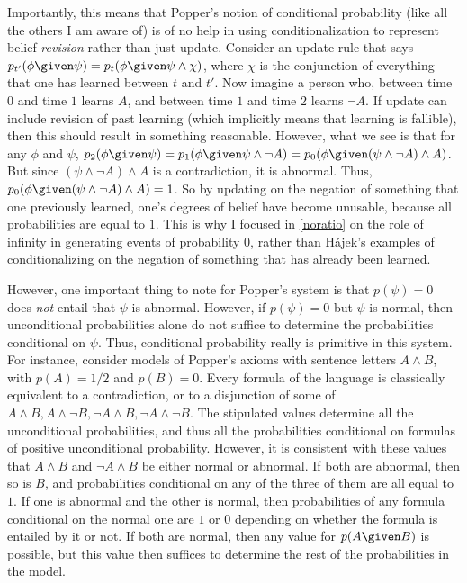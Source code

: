 Importantly, this means that Popper's notion of conditional probability (like all the others I am aware of) is of no help in using conditionalization to represent belief \emph{revision} rather than just update. Consider an update rule that says $p_{t'}(\phi \given \psi)=p_{t}(\phi \given \psi\land\chi)$, where $\chi$ is the conjunction of everything that one has learned between $t$ and $t'$. Now imagine a person who, between time $0$ and time $1$ learns $A$, and between time $1$ and time $2$ learns $\lnot A$. If update can include revision of past learning (which implicitly means that learning is fallible), then this should result in something reasonable. However, what we see is that for any $\phi$ and $\psi$, $p_2(\phi \given \psi)=p_1(\phi \given \psi\land\lnot A)=p_0(\phi \given (\psi\land\lnot A)\land A)$. But since $(\psi\land\lnot A)\land A$ is a contradiction, it is abnormal. Thus, $p_0(\phi \given (\psi\land\lnot A)\land A)=1$. So by updating on the negation of something that one previously learned, one's degrees of belief have become unusable, because all probabilities are equal to $1$. This is why I focused in \autoref{noratio} on the role of infinity in generating events of  probability $0$, rather than H\'{a}jek's examples of conditionalizing on the negation of something that has already been learned.

However, one important thing to note for Popper's system is that $p(\psi)=0$ does \emph{not} entail that $\psi$ is abnormal. However, if $p(\psi)=0$ but $\psi$ is normal, then unconditional probabilities alone do not suffice to determine the probabilities conditional on $\psi$. Thus, conditional probability really is primitive in this system. For instance, consider models of Popper's axioms with sentence letters $A\land B$, with $p(A)=1/2$ and $p(B)=0$. Every formula of the language is classically equivalent to a contradiction, or to a disjunction of some of $A\land B, A\land\lnot B, \lnot A\land B, \lnot A\land\lnot B$. The stipulated values determine all the unconditional probabilities, and thus all the probabilities conditional on formulas of positive unconditional probability. However, it is consistent with these values that $A\land B$ and $\lnot A\land B$ be either normal or abnormal. If both are abnormal, then so is $B$, and probabilities conditional on any of the three of them are all equal to $1$. If one is abnormal and the other is normal, then probabilities of any formula conditional on the normal one are $1$ or $0$ depending on whether the formula is entailed by it or not. If both are normal, then any value for $p(A \given B)$ is possible, but this value then suffices to determine the rest of the probabilities in the model.

